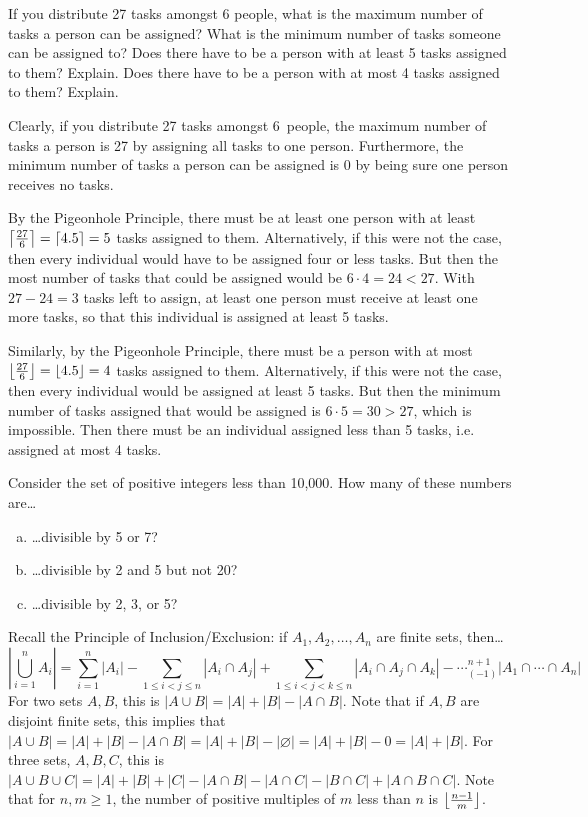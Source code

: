 \documentclass[11pt,letterpaper]{article}
\begin{document}
\newpage



 If you distribute 27 tasks amongst 6 people, what is the maximum number of tasks a person can be assigned? What is the minimum number of tasks someone can be assigned to? Does there have to be a person with at least 5 tasks assigned to them? Explain. Does there have to be a person with at most 4 tasks assigned to them? Explain. \pspace

\sol Clearly, if you distribute 27 tasks amongst 6~people, the maximum number of tasks a person is 27 by assigning all tasks to one person. Furthermore, the minimum number of tasks a person can be assigned is 0 by being sure one person receives no tasks. \pspace

By the Pigeonhole Principle, there must be at least one person with at least $\ceil*{\frac{27}{6}}= \ceil*{4.5}= 5$ tasks assigned to them. Alternatively, if this were not the case, then every individual would have to be assigned four or less tasks. But then the most number of tasks that could be assigned would be $6 \cdot 4= 24 < 27$. With $27 - 24= 3$ tasks left to assign, at least one person must receive at least one more tasks, so that this individual is assigned at least 5 tasks. \pspace

Similarly, by the Pigeonhole Principle, there must be a person with at most $\floor*{\frac{27}{6}}= \floor*{4.5}= 4$ tasks assigned to them. Alternatively, if this were not the case, then every individual would be assigned at least 5 tasks. But then the minimum number of tasks assigned that would be assigned is $6 \cdot 5= 30 > 27$, which is impossible. Then there must be an individual assigned less than 5 tasks, i.e. assigned at most 4 tasks. 



\newpage



 Consider the set of positive integers less than 10,000. How many of these numbers are\dots
	\begin{enumerate}[(a)]
	\item \dots divisible by 5 or 7?
	\item \dots divisible by 2 and 5 but not 20?
	\item \dots divisible by 2, 3, or 5?
	\end{enumerate} \pspace

\sol Recall the Principle of Inclusion/Exclusion: if $A_1, A_2, \ldots, A_n$ are finite sets, then\dots
	\[
	\left| \bigcup_{i=1}^n A_i \right|= \sum_{i=1}^n |A_i| - \sum_{1 \leq i < j \leq n} |A_i \cap A_j| + \sum_{1 \leq i < j < k \leq n} |A_i \cap A_j \cap A_k| - \cdots _ (-1)^{n+1} |A_1 \cap \cdots \cap A_n|
	\]
For two sets $A, B$, this is $|A \cup B|= |A| + |B| - |A \cap B|$. Note that if $A, B$ are disjoint finite sets, this implies that $|A \cup B|= |A| + |B| - |A \cap B|= |A| + |B| - |\varnothing|= |A| + |B| - 0= |A| + |B|$. For three sets, $A, B, C$, this is $|A \cup B \cup C|= |A| + |B| + |C| - |A \cap B| - |A \cap C| - |B \cap C| + |A \cap B \cap C|$. Note that for $n, m \geq 1$, the number of positive multiples of $m$ less than $n$ is $\floor*{\frac{n - 1}{m}}$.
\end{document}

